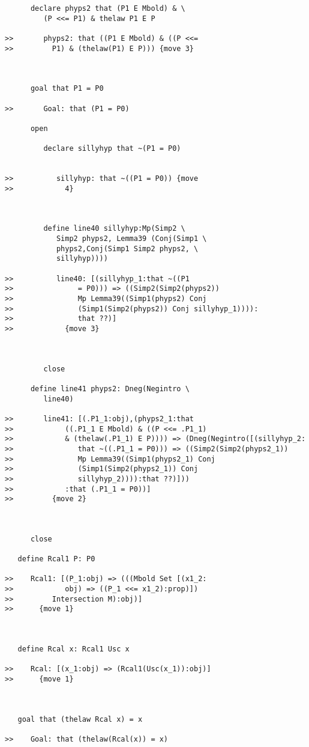 \documentclass[12pt]{article}
\begin{document}
\begin{verbatim}
      declare phyps2 that (P1 E Mbold) & \
         (P <<= P1) & thelaw P1 E P

>>       phyps2: that ((P1 E Mbold) & ((P <<=
>>         P1) & (thelaw(P1) E P))) {move 3}



      goal that P1 = P0

>>       Goal: that (P1 = P0)

      open

         declare sillyhyp that ~(P1 = P0)


>>          sillyhyp: that ~((P1 = P0)) {move
>>            4}



         define line40 sillyhyp:Mp(Simp2 \
            Simp2 phyps2, Lemma39 (Conj(Simp1 \
            phyps2,Conj(Simp1 Simp2 phyps2, \
            sillyhyp))))

>>          line40: [(sillyhyp_1:that ~((P1
>>               = P0))) => ((Simp2(Simp2(phyps2))
>>               Mp Lemma39((Simp1(phyps2) Conj
>>               (Simp1(Simp2(phyps2)) Conj sillyhyp_1)))):
>>               that ??)]
>>            {move 3}



         close

      define line41 phyps2: Dneg(Negintro \
         line40)

>>       line41: [(.P1_1:obj),(phyps2_1:that
>>            ((.P1_1 E Mbold) & ((P <<= .P1_1)
>>            & (thelaw(.P1_1) E P)))) => (Dneg(Negintro([(sillyhyp_2:
>>               that ~((.P1_1 = P0))) => ((Simp2(Simp2(phyps2_1))
>>               Mp Lemma39((Simp1(phyps2_1) Conj
>>               (Simp1(Simp2(phyps2_1)) Conj
>>               sillyhyp_2)))):that ??)]))
>>            :that (.P1_1 = P0))]
>>         {move 2}



      close

   define Rcal1 P: P0

>>    Rcal1: [(P_1:obj) => (((Mbold Set [(x1_2:
>>            obj) => ((P_1 <<= x1_2):prop)])
>>         Intersection M):obj)]
>>      {move 1}



   define Rcal x: Rcal1 Usc x

>>    Rcal: [(x_1:obj) => (Rcal1(Usc(x_1)):obj)]
>>      {move 1}



   goal that (thelaw Rcal x) = x

>>    Goal: that (thelaw(Rcal(x)) = x)


\end{verbatim}
\end{document}
